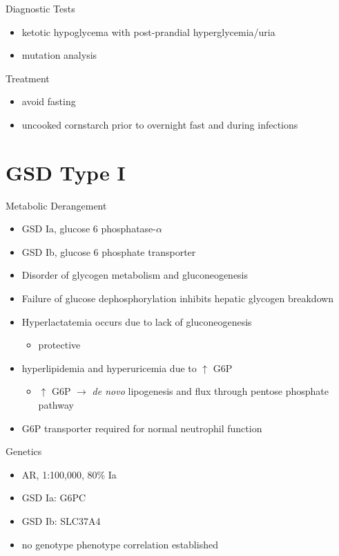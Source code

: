 \documentclass[presentation, smaller]{beamer}
\begin{document}
\begin{frame}[label={sec:org86ac99f}]{Diagnostic Tests}
\begin{itemize}
\item ketotic hypoglycema with post-prandial hyperglycemia/uria
\item mutation analysis
\end{itemize}
\end{frame}
\begin{frame}[label={sec:org9263c86}]{Treatment}
\begin{itemize}
\item avoid fasting
\item uncooked cornstarch prior to overnight fast and during infections
\end{itemize}
\end{frame}
\section{GSD Type I}
\label{sec:orgd7d033f}
\begin{frame}[label={sec:org5cfd1ae}]{Metabolic Derangement}
\begin{itemize}
\item GSD Ia, glucose 6 phosphatase-\(\alpha\)
\item GSD Ib, glucose 6 phosphate transporter
\item Disorder of glycogen metabolism and gluconeogenesis
\item Failure of glucose dephosphorylation inhibits hepatic glycogen breakdown
\item Hyperlactatemia occurs due to lack of gluconeogenesis
\begin{itemize}
\item protective
\end{itemize}
\item hyperlipidemia and hyperuricemia due to \(\uparrow\) G6P
\begin{itemize}
\item \(\uparrow\) G6P \(\to\) \emph{de novo} lipogenesis and flux through pentose phosphate pathway
\end{itemize}
\item G6P transporter required for normal neutrophil function
\end{itemize}
\end{frame}

\begin{frame}[label={sec:org0614dda}]{Genetics}
\begin{itemize}
\item AR, 1:100,000, 80\% Ia
\item GSD Ia: G6PC
\item GSD Ib: SLC37A4
\item no genotype phenotype correlation established
\end{itemize}
\end{frame}
\end{document}
